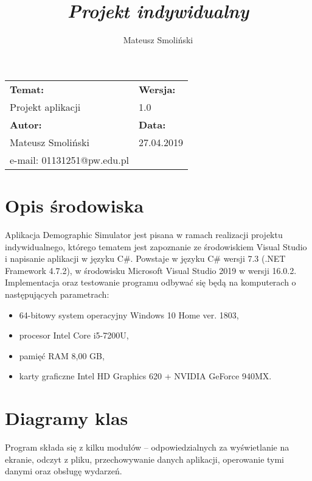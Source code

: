 \documentclass[a4paper,12pt]{article}
\title{ \sc{Specyfikacja implementacyjna} \\
\emph{Projekt indywidualny} }
\author{Mateusz Smoliński}
\newcommand\tab[1][0.6cm]{\hspace*{#1} }
\begin{document}
\maketitle

\thispagestyle{empty}

\begin{tabu} to 0.9\textwidth{ |X[c]|X[c]| } 
 \hline
 \textbf{Temat:} & \textbf{Wersja:} \\ 
 Projekt aplikacji & 1.0 \\ 
 \hline
 \textbf{Autor:} & \textbf{Data:} \\ 
 Mateusz Smoliński & 27.04.2019 \\
 e-mail: 01131251@pw.edu.pl & \\
 \hline
\end{tabu}


\tableofcontents

\newpage

\section{Opis środowiska}

\tab Aplikacja Demographic Simulator jest pisana w ramach realizacji projektu indywidualnego, którego tematem jest zapoznanie ze środowiskiem Visual Studio i napisanie aplikacji w języku C\#. Powstaje w języku C\# wersji 7.3 (.NET Framework 4.7.2), w środowisku Microsoft Visual Studio 2019 w wersji 16.0.2. Implementacja oraz testowanie programu odbywać się będą na komputerach o następujących parametrach: 

\begin{itemize}

\item 64-bitowy system operacyjny Windows 10 Home ver. 1803,
\item procesor Intel Core i5-7200U,
\item pamięć RAM 8,00 GB,
\item karty graficzne Intel HD Graphics 620 + NVIDIA GeForce 940MX.

\end{itemize}

\section{Diagramy klas}

\tab Program składa się z kilku modułów -- odpowiedzialnych za wyświetlanie na ekranie, odczyt z pliku, przechowywanie danych aplikacji, operowanie tymi danymi oraz obsługę wydarzeń.
\end{document}

